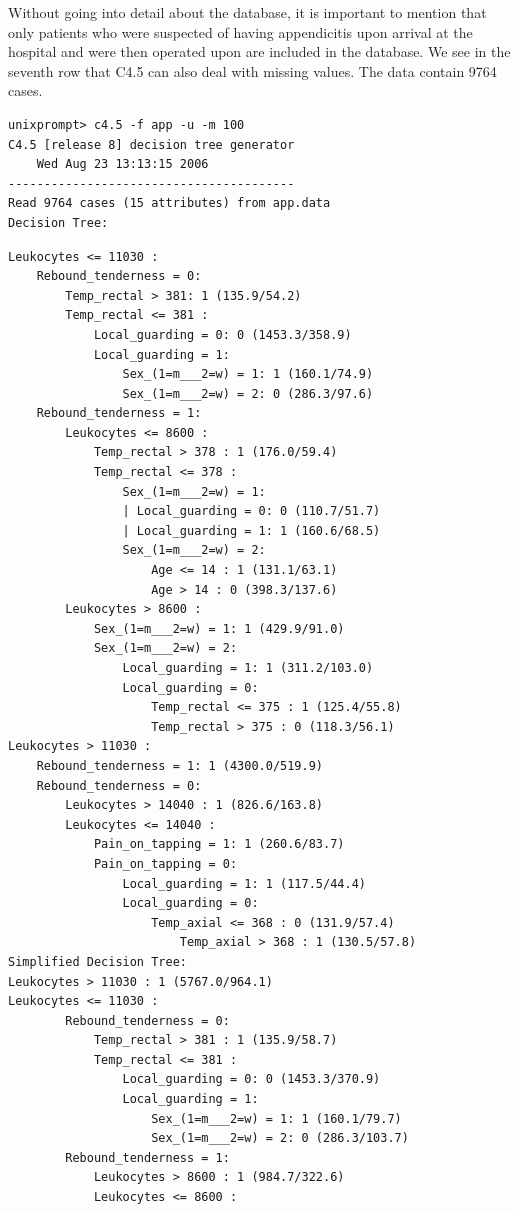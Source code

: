 \documentclass[10pt]{book}
\begin{document}
\begin{center}
\begin{enumerate}
\begin{center}
\begin{center}
Without going into detail about the database, it is important to mention that only patients who were suspected of having appendicitis upon arrival at the hospital and were then operated upon are included in the database. We see in the seventh row that C4.5 can also deal with missing values. The data contain 9764 cases.

\begin{verbatim}
unixprompt> c4.5 -f app -u -m 100
C4.5 [release 8] decision tree generator
    Wed Aug 23 13:13:15 2006
----------------------------------------
Read 9764 cases (15 attributes) from app.data
Decision Tree:
\end{verbatim}

\begin{verbatim}
Leukocytes <= 11030 :
    Rebound_tenderness = 0:
        Temp_rectal > 381: 1 (135.9/54.2)
        Temp_rectal <= 381 :
            Local_guarding = 0: 0 (1453.3/358.9)
            Local_guarding = 1:
                Sex_(1=m___2=w) = 1: 1 (160.1/74.9)
                Sex_(1=m___2=w) = 2: 0 (286.3/97.6)
    Rebound_tenderness = 1:
        Leukocytes <= 8600 :
            Temp_rectal > 378 : 1 (176.0/59.4)
            Temp_rectal <= 378 :
                Sex_(1=m___2=w) = 1:
                | Local_guarding = 0: 0 (110.7/51.7)
                | Local_guarding = 1: 1 (160.6/68.5)
                Sex_(1=m___2=w) = 2:
                    Age <= 14 : 1 (131.1/63.1)
                    Age > 14 : 0 (398.3/137.6)
        Leukocytes > 8600 :
            Sex_(1=m___2=w) = 1: 1 (429.9/91.0)
            Sex_(1=m___2=w) = 2:
                Local_guarding = 1: 1 (311.2/103.0)
                Local_guarding = 0:
                    Temp_rectal <= 375 : 1 (125.4/55.8)
                    Temp_rectal > 375 : 0 (118.3/56.1)
Leukocytes > 11030 :
    Rebound_tenderness = 1: 1 (4300.0/519.9)
    Rebound_tenderness = 0:
        Leukocytes > 14040 : 1 (826.6/163.8)
        Leukocytes <= 14040 :
            Pain_on_tapping = 1: 1 (260.6/83.7)
            Pain_on_tapping = 0:
                Local_guarding = 1: 1 (117.5/44.4)
                Local_guarding = 0:
                    Temp_axial <= 368 : 0 (131.9/57.4)
                        Temp_axial > 368 : 1 (130.5/57.8)
Simplified Decision Tree:
Leukocytes > 11030 : 1 (5767.0/964.1)
Leukocytes <= 11030 :
        Rebound_tenderness = 0:
            Temp_rectal > 381 : 1 (135.9/58.7)
            Temp_rectal <= 381 :
                Local_guarding = 0: 0 (1453.3/370.9)
                Local_guarding = 1:
                    Sex_(1=m___2=w) = 1: 1 (160.1/79.7)
                    Sex_(1=m___2=w) = 2: 0 (286.3/103.7)
        Rebound_tenderness = 1:
            Leukocytes > 8600 : 1 (984.7/322.6)
            Leukocytes <= 8600 :
\end{verbatim}


\end{center}
\end{center}
\end{enumerate}
\end{center}
\end{document}

